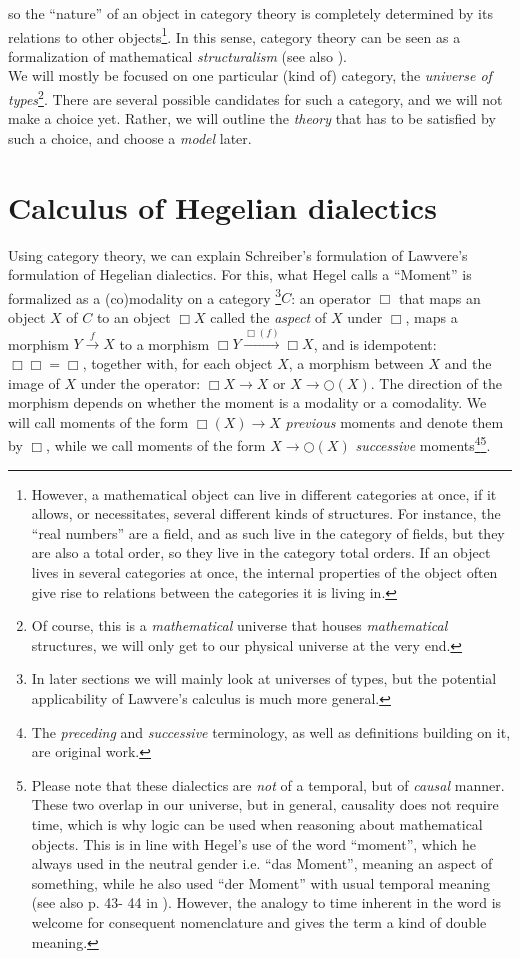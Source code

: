 \documentclass{article}
\begin{document}
so the ``nature'' of an object in category theory is completely determined by its relations to other objects\footnote{However,
a mathematical object can live in different categories at once, if it allows, or necessitates, several
different kinds of structures. For instance, the ``real numbers'' are a field, and as such live in the
category of fields, but they are also a total order, so they live in the category total orders. If an
object lives in several categories at once, the internal properties of the object often give rise to relations
between the categories it is living in.}. In this sense, category theory can be seen as a formalization
of mathematical \emph{structuralism} (see also \cite{Ad03}). \\

We will mostly be focused on one particular (kind of) category, the \emph{universe of types}\footnote{Of
course, this is a \emph{mathematical} universe that houses \emph{mathematical} structures, we will only
get to our physical universe at the very end.}. There are several possible candidates for such a category,
and we will not make a choice yet. Rather, we will outline the \emph{theory} that has to be satisfied
by such a choice, and choose a \emph{model} later.


\section{Calculus of Hegelian dialectics}
Using category theory, we can explain Schreiber's formulation of Lawvere's formulation of Hegelian dialectics.
For this, what Hegel calls a ``Moment'' is formalized as a (co)modality on a category \footnote{In later
sections we will mainly look at universes of types, but the potential applicability of Lawvere's calculus
is much more general.}$C$: an operator $\Box$ that maps an object $X$ of $C$ to an object $\Box X$ called
the \emph{aspect} of $X$ under $\Box$, maps a morphism $Y\xrightarrow{f} X$ to a morphism $\Box Y\xrightarrow{\Box(f)}\Box
X$, and is idempotent: $\Box\Box =\Box$, together with, for each object $X$, a morphism between $X$ and
the image of $X$ under the operator: $\Box X\rightarrow X$ or $X\rightarrow \bigcirc(X)$. The direction
of the morphism depends on whether the moment is a modality or a comodality. We will call moments of the
form $\Box(X)\rightarrow X$ \emph{previous} moments and denote them by $\Box$, while we call moments of
the form $X\rightarrow \bigcirc(X)$ \emph{successive} moments\footnote{The \emph{preceding} and \emph{successive}
terminology, as well as definitions building on it, are original work.}\footnote{Please note that these
dialectics are \emph{not} of a temporal, but of \emph{causal} manner. These two overlap in our universe,
but in general, causality does not require time, which is why logic can be used when reasoning about mathematical
objects. This is in line with Hegel's use of the word  ``moment'', which he always used in the neutral
gender i.e. ``das Moment'', meaning an aspect of something, while he also used ``der Moment'' with usual
temporal meaning (see also p. 43- 44 in \cite{Kli}). However, the analogy to time inherent in the word
is welcome for consequent nomenclature and gives the term a kind of double meaning.}.
\end{document}
